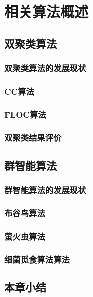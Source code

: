 \chapter{相关算法概述}

\section{双聚类算法}
  \subsection{双聚类算法的发展现状}

  \subsection{CC算法}

  \subsection{FLOC算法}
  
  \subsection{双聚类结果评价}

\section{群智能算法}

  \subsection{群智能算法的发展现状}

  \subsection{布谷鸟算法}

  \subsection{萤火虫算法}

  \subsection{细菌觅食算法算法}

\section{本章小结}